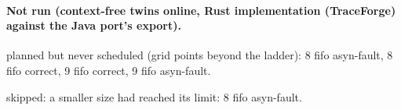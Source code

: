 \documentclass[10pt]{article}
\begin{document}
\paragraph{Not run (context-free twins online, Rust implementation (TraceForge) against the Java port's export).}
planned but never scheduled (grid points beyond the ladder): 8 fifo asyn-fault, 8 fifo correct, 9 fifo correct, 9 fifo asyn-fault.\par
skipped: a smaller size had reached its limit: 8 fifo asyn-fault.\par
\end{document}
